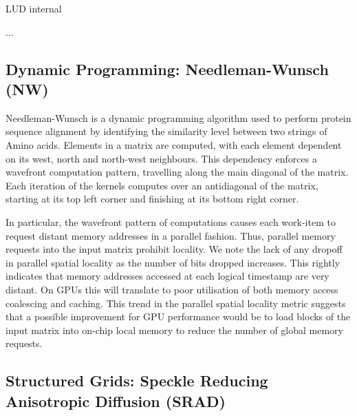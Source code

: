 \documentclass[review=false, sigchi]{acmart}
\begin{document}
	LUD internal %
	
	
	...  %
	
	\subsection{Dynamic Programming: Needleman-Wunsch (NW)}
	
	Needleman-Wunsch is a dynamic programming algorithm used to perform protein sequence alignment by identifying the similarity level between two strings of Amino acids. Elements in a matrix are computed, with each element dependent on its west, north and north-west neighbours. This dependency enforces a wavefront computation pattern, travelling along the main diagonal of the matrix. Each iteration of the kernels computes over an antidiagonal of the matrix, starting at its top left corner and finishing at its bottom right corner.
	
	In particular, the wavefront pattern of computations causes each work-item to request distant memory addresses in a parallel fashion. Thus, parallel memory requests into the input matrix prohibit locality. We note the lack of any dropoff in parallel spatial locality as the number of bits dropped increases. This rightly indicates that memory addresses accessed at each logical timestamp are very distant. On GPUs this will translate to poor utilisation of both memory access coalescing and caching. This trend in the parallel spatial locality metric suggests that a possible improvement for GPU performance would be to load blocks of the input matrix into on-chip local memory to reduce the number of global memory requests. 
	
	\subsection{Structured Grids: Speckle Reducing Anisotropic Diffusion (SRAD)}
	
\end{document}
